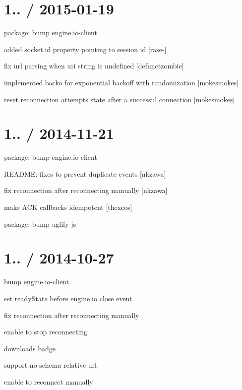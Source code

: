 \section*{1.. / 2015-\/01-\/19 }


\begin{DoxyItemize}
\item package\+: bump {\ttfamily engine.\+io-\/client}
\item added {\ttfamily socket.\+id} property pointing to session id \mbox{[}rase-\/\mbox{]}
\item fix url parsing when uri string is undefined \mbox{[}defunctzombie\mbox{]}
\item implemented {\ttfamily backo} for exponential backoff with randomization \mbox{[}mokesmokes\mbox{]}
\item reset reconnection attempts state after a successul connection \mbox{[}mokesmokes\mbox{]}
\end{DoxyItemize}

\section*{1.. / 2014-\/11-\/21 }


\begin{DoxyItemize}
\item package\+: bump {\ttfamily engine.\+io-\/client}
\item R\+E\+A\+D\+ME\+: fixes to prevent duplicate events \mbox{[}nkzawa\mbox{]}
\item fix reconnection after reconnecting manually \mbox{[}nkzawa\mbox{]}
\item make A\+CK callbacks idempotent \mbox{[}thexeos\mbox{]}
\item package\+: bump {\ttfamily uglify-\/js}
\end{DoxyItemize}

\section*{1.. / 2014-\/10-\/27 }


\begin{DoxyItemize}
\item bump {\ttfamily engine.\+io-\/client}.
\item set {\ttfamily ready\+State} before engine.\+io close event
\item fix reconnection after reconnecting manually
\item enable to stop reconnecting
\item downloads badge
\item support no schema relative url
\item enable to reconnect manually
\end{DoxyItemize}

